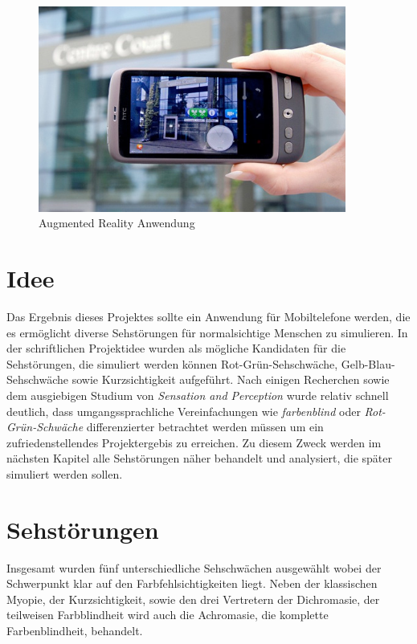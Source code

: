 \documentclass[a4paper]{article}
\begin{document}
\begin{figure}[H]
\centering
\includegraphics[width=0.9\textwidth, trim=0 40 0 50, clip=true]{augmented-reality.jpg}
\caption{Augmented Reality Anwendung}
\label{augmented-reality}
\end{figure}

\newpage

\section*{Idee}
Das Ergebnis dieses Projektes sollte ein Anwendung für Mobiltelefone werden, die es ermöglicht diverse Sehstörungen für normalsichtige Menschen zu simulieren. In der schriftlichen Projektidee wurden als mögliche Kandidaten für die Sehstörungen, die simuliert werden können Rot-Grün-Sehschwäche, Gelb-Blau-Sehschwäche sowie Kurzsichtigkeit aufgeführt. Nach einigen Recherchen sowie dem ausgiebigen Studium von \textit{Sensation and Perception} \cite{Goldstein2009} wurde relativ schnell deutlich, dass umgangssprachliche Vereinfachungen wie \textit{farbenblind} oder \textit{Rot-Grün-Schwäche} differenzierter betrachtet werden müssen um ein zufriedenstellendes Projektergebis zu erreichen. Zu diesem Zweck werden im nächsten Kapitel alle Sehstörungen näher behandelt und analysiert, die später simuliert werden sollen.

\section*{Sehstörungen}
Insgesamt wurden fünf unterschiedliche Sehschwächen ausgewählt wobei der Schwerpunkt klar auf den Farbfehlsichtigkeiten liegt. Neben der klassischen Myopie, der Kurzsichtigkeit, sowie den drei Vertretern der Dichromasie, der teilweisen Farbblindheit \cite{WP-D2011} wird auch die Achromasie, die komplette Farbenblindheit, behandelt. 
\end{document}

